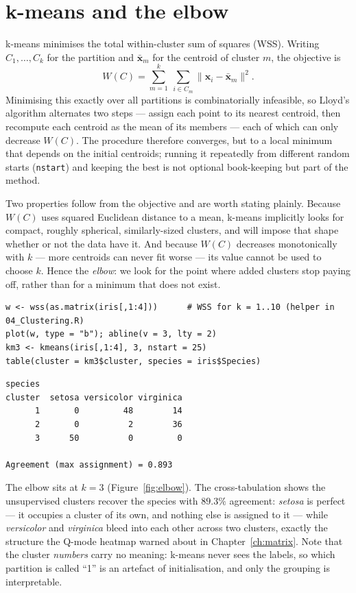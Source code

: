 \documentclass[11pt,oneside]{book}
\newcommand{\code}[1]{\texttt{#1}}
\begin{document}
\section{k-means and the elbow}
k-means minimises the total within-cluster sum of squares (WSS). Writing $C_1,\dots,C_k$
for the partition and $\bar{\mathbf{x}}_m$ for the centroid of cluster $m$, the objective is
\[
  W(C)=\sum_{m=1}^{k}\ \sum_{i\in C_m}\lVert \mathbf{x}_i-\bar{\mathbf{x}}_m\rVert^{2}.
\]
Minimising this exactly over all partitions is combinatorially infeasible, so Lloyd's
algorithm alternates two steps — assign each point to its nearest centroid, then recompute
each centroid as the mean of its members — each of which can only decrease $W(C)$. The
procedure therefore converges, but to a local minimum that depends on the initial centroids;
running it repeatedly from different random starts (\code{nstart}) and keeping the best is
not optional book-keeping but part of the method.

Two properties follow from the objective and are worth stating plainly. Because $W(C)$ uses
squared Euclidean distance to a mean, k-means implicitly looks for compact, roughly
spherical, similarly-sized clusters, and will impose that shape whether or not the data have
it. And because $W(C)$ decreases monotonically with $k$ — more centroids can never fit worse
— its value cannot be used to choose $k$. Hence the \emph{elbow}: we look for the point where
added clusters stop paying off, rather than for a minimum that does not exist.

\begin{lstlisting}
w <- wss(as.matrix(iris[,1:4]))      # WSS for k = 1..10 (helper in 04_Clustering.R)
plot(w, type = "b"); abline(v = 3, lty = 2)
km3 <- kmeans(iris[,1:4], 3, nstart = 25)
table(cluster = km3$cluster, species = iris$Species)
\end{lstlisting}

\begin{lstlisting}[style=rout]
        species
cluster  setosa versicolor virginica
      1       0         48        14
      2       0          2        36
      3      50          0         0

Agreement (max assignment) = 0.893
\end{lstlisting}

The elbow sits at $k=3$ (Figure~\ref{fig:elbow}). The cross-tabulation shows the
unsupervised clusters recover the species with $89.3\%$ agreement: \emph{setosa} is
perfect — it occupies a cluster of its own, and nothing else is assigned to it — while
\emph{versicolor} and \emph{virginica} bleed into each other across two clusters, exactly
the structure the Q-mode heatmap warned about in Chapter~\ref{ch:matrix}. Note that the cluster
\emph{numbers} carry no meaning: k-means never sees the labels, so which partition is
called ``1'' is an artefact of initialisation, and only the grouping is interpretable.
\end{document}
